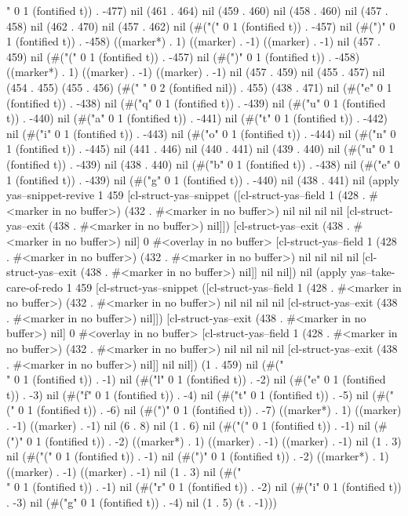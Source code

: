 " 0 1 (fontified t)) . -477) nil (461 . 464) nil (459 . 460) nil (458 . 460) nil (457 . 458) nil (462 . 470) nil (457 . 462) nil (#("(" 0 1 (fontified t)) . -457) nil (#(")" 0 1 (fontified t)) . -458) ((marker*) . 1) ((marker) . -1) ((marker) . -1) nil (457 . 459) nil (#("(" 0 1 (fontified t)) . -457) nil (#(")" 0 1 (fontified t)) . -458) ((marker*) . 1) ((marker) . -1) ((marker) . -1) nil (457 . 459) nil (455 . 457) nil (454 . 455) (455 . 456) (#("  " 0 2 (fontified nil)) . 455) (438 . 471) nil (#("e" 0 1 (fontified t)) . -438) nil (#("q" 0 1 (fontified t)) . -439) nil (#("u" 0 1 (fontified t)) . -440) nil (#("a" 0 1 (fontified t)) . -441) nil (#("t" 0 1 (fontified t)) . -442) nil (#("i" 0 1 (fontified t)) . -443) nil (#("o" 0 1 (fontified t)) . -444) nil (#("n" 0 1 (fontified t)) . -445) nil (441 . 446) nil (440 . 441) nil (439 . 440) nil (#("u" 0 1 (fontified t)) . -439) nil (438 . 440) nil (#("b" 0 1 (fontified t)) . -438) nil (#("e" 0 1 (fontified t)) . -439) nil (#("g" 0 1 (fontified t)) . -440) nil (438 . 441) nil (apply yas--snippet-revive 1 459 [cl-struct-yas--snippet ([cl-struct-yas--field 1 (428 . #<marker in no buffer>) (432 . #<marker in no buffer>) nil nil nil nil [cl-struct-yas--exit (438 . #<marker in no buffer>) nil]]) [cl-struct-yas--exit (438 . #<marker in no buffer>) nil] 0 #<overlay in no buffer> [cl-struct-yas--field 1 (428 . #<marker in no buffer>) (432 . #<marker in no buffer>) nil nil nil nil [cl-struct-yas--exit (438 . #<marker in no buffer>) nil]] nil nil]) nil (apply yas--take-care-of-redo 1 459 [cl-struct-yas--snippet ([cl-struct-yas--field 1 (428 . #<marker in no buffer>) (432 . #<marker in no buffer>) nil nil nil nil [cl-struct-yas--exit (438 . #<marker in no buffer>) nil]]) [cl-struct-yas--exit (438 . #<marker in no buffer>) nil] 0 #<overlay in no buffer> [cl-struct-yas--field 1 (428 . #<marker in no buffer>) (432 . #<marker in no buffer>) nil nil nil nil [cl-struct-yas--exit (438 . #<marker in no buffer>) nil]] nil nil]) (1 . 459) nil (#("\\" 0 1 (fontified t)) . -1) nil (#("l" 0 1 (fontified t)) . -2) nil (#("e" 0 1 (fontified t)) . -3) nil (#("f" 0 1 (fontified t)) . -4) nil (#("t" 0 1 (fontified t)) . -5) nil (#("(" 0 1 (fontified t)) . -6) nil (#(")" 0 1 (fontified t)) . -7) ((marker*) . 1) ((marker) . -1) ((marker) . -1) nil (6 . 8) nil (1 . 6) nil (#("(" 0 1 (fontified t)) . -1) nil (#(")" 0 1 (fontified t)) . -2) ((marker*) . 1) ((marker) . -1) ((marker) . -1) nil (1 . 3) nil (#("(" 0 1 (fontified t)) . -1) nil (#(")" 0 1 (fontified t)) . -2) ((marker*) . 1) ((marker) . -1) ((marker) . -1) nil (1 . 3) nil (#("\\" 0 1 (fontified t)) . -1) nil (#("r" 0 1 (fontified t)) . -2) nil (#("i" 0 1 (fontified t)) . -3) nil (#("g" 0 1 (fontified t)) . -4) nil (1 . 5) (t . -1)))
